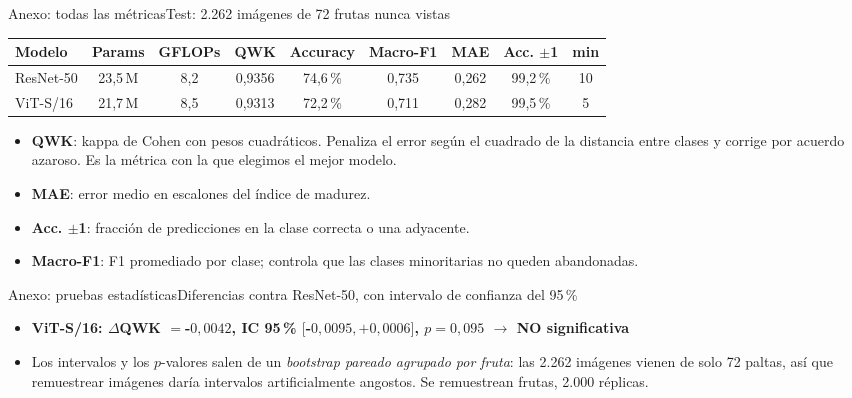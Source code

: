 \documentclass[aspectratio=169,11pt,table]{beamer}
\newcommand{\nosig}{\textcolor{rojo}{\textbf{NO significativa}}}
\begin{document}
\begin{frame}{Anexo: todas las métricas}{Test: 2.262 imágenes de 72 frutas nunca vistas}
{\scriptsize
\centering
\begin{tabular}{lcccccccc}
\toprule
\rowcolor{verdeosc}\color{white}\bfseries Modelo & \color{white}\bfseries Params & \color{white}\bfseries GFLOPs & \color{white}\bfseries QWK & \color{white}\bfseries Accuracy & \color{white}\bfseries Macro-F1 & \color{white}\bfseries MAE & \color{white}\bfseries Acc. $\pm$1 & \color{white}\bfseries min \\
\midrule
ResNet-50 & 23{,}5\,M & 8{,}2 & 0{,}9356 & 74{,}6\,\% & 0{,}735 & 0{,}262 & 99{,}2\,\% & 10 \\
ViT-S/16 & 21{,}7\,M & 8{,}5 & 0{,}9313 & 72{,}2\,\% & 0{,}711 & 0{,}282 & 99{,}5\,\% & 5 \\
\bottomrule
\end{tabular}
}
\vspace{0.5em}
{\tiny
\setlength{\itemsep}{0.18em}
\begin{itemize}
  \item \textbf{QWK}: kappa de Cohen con pesos cuadráticos. Penaliza el error según el cuadrado de la distancia entre clases y corrige por acuerdo azaroso. Es la métrica con la que elegimos el mejor modelo.
  \item \textbf{MAE}: error medio en escalones del índice de madurez.
  \item \textbf{Acc. $\pm$1}: fracción de predicciones en la clase correcta o una adyacente.
  \item \textbf{Macro-F1}: F1 promediado por clase; controla que las clases minoritarias no queden abandonadas.
\end{itemize}
}
\end{frame}

\begin{frame}{Anexo: pruebas estadísticas}{Diferencias contra ResNet-50, con intervalo de confianza del 95\,\%}
{\scriptsize
\setlength{\itemsep}{0.25em}
\begin{itemize}
  \item {\bfseries ViT-S/16: $\Delta$QWK $= $-$0{,}0042$, IC 95\,\% $[$-$0{,}0095, +0{,}0006]$, $p=0{,}095$ $\rightarrow$ \nosig}
  \item Los intervalos y los $p$-valores salen de un \emph{bootstrap pareado agrupado por fruta}: las 2.262 imágenes vienen de solo 72 paltas, así que remuestrear imágenes daría intervalos artificialmente angostos. Se remuestrean frutas, 2.000 réplicas.
\end{itemize}
}
\end{frame}
\end{document}
